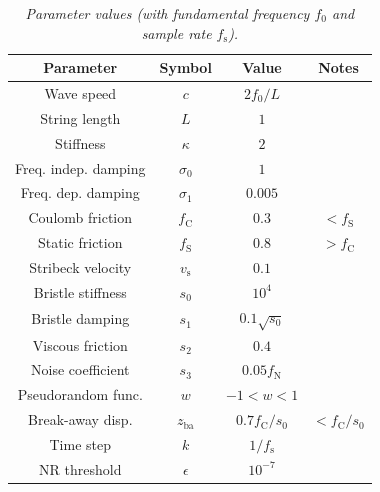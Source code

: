 \documentclass[twoside,a4paper,dvipsnames]{article}
\begin{document}
\begin{table}[ht]
  \caption{{\it Parameter values (with fundamental frequency $f_0$ and sample rate $f_\text{s}$).}}
	\centering
  \begin{tabular}{|c|c|c|c|}\hline
    Parameter & Symbol & Value & Notes\\ \hline
    Wave speed & $c$ & $2 f_0/L$ & \\
    String length & $L$ & $1$ & \\
    Stiffness & $\kappa$ & $2$ & \\
    Freq. indep. damping & $\sigma_0$ & $1$ & \\
    Freq. dep. damping & $\sigma_1$ & $0.005$ & \\
    Coulomb friction & $f_\text{C}$ & $0.3$ & $<f_\text{S}$ \\
    Static friction & $f_\text{S}$ & $0.8$ & $>f_\text{C}$ \\
    Stribeck velocity & $v_\text{s}$ & $0.1$ & \\
    Bristle stiffness & $s_0$ & $10^4$ & \\
    Bristle damping & $s_1$ & $0.1\sqrt{s_0}$ & \\
    Viscous friction & $s_2$ & $0.4$ & \\
    Noise coefficient & $s_3$ & $0.05f_\text{N}$ & \\
    Pseudorandom func. & $w$ & $-1<w<1$ & \\
    Break-away disp.& $z_\text{ba}$ & $0.7 f_\text{C}/s_0$ & $<f_\text{C}/s_0$ \\
    Time step & $k$ & $1/f_\text{s}$ & \\
    NR threshold & $\epsilon$ & $10^{-7}$ & \\
    \hline
 \end{tabular}
  \label{tab:parameters}
\end{table}
\end{document}
